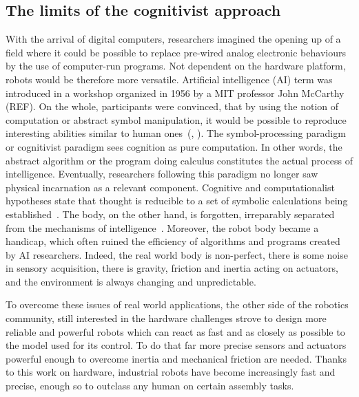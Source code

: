 \subsection{The limits of the cognitivist approach} %


With the arrival of digital computers, researchers imagined the opening up of a field where it could be possible to replace pre-wired analog electronic behaviours by the use of computer-run programs. Not dependent on the hardware platform, robots would be therefore more versatile.
Artificial intelligence (AI) term was introduced in a workshop organized in 1956 by a MIT professor John McCarthy (REF). On the whole, participants were convinced, that by using the notion of computation or abstract symbol manipulation, it would be possible to reproduce interesting abilities similar to human ones~(\cite{kaufmann1979machines}, \cite{haugeland1989artificial}). The symbol-processing paradigm or cognitivist paradigm sees cognition as pure computation. In other words, the abstract algorithm or the program doing calculus constitutes the actual process of intelligence. Eventually, researchers following this paradigm no longer saw physical incarnation as a relevant component. Cognitive and computationalist hypotheses state that thought is reducible to a set of symbolic calculations being established~\parencite{fodor1987psychosemantics}. The body, on the other hand, is forgotten, irreparably separated from the mechanisms of intelligence~\parencite{kaplan2008corps}.
Moreover, the robot body became a handicap, which often ruined the efficiency of algorithms and programs created by AI researchers. Indeed, the real world body is non-perfect, there is some noise in sensory acquisition, there is gravity, friction and inertia acting on actuators, and the environment is always changing and unpredictable.

To overcome these issues of real world applications, the other side of the robotics community, still interested in the hardware challenges strove to design more reliable and powerful robots which can react as fast and as closely as possible to the model used for its control. To do that far more precise sensors and actuators powerful enough to overcome inertia and mechanical friction are needed. Thanks to this work on hardware, industrial robots have become increasingly fast and precise, enough so to outclass any human on certain assembly tasks.

